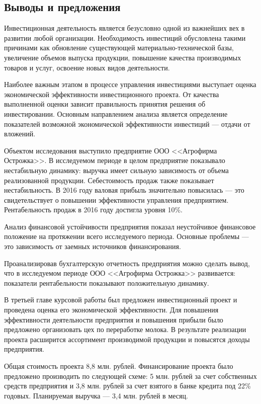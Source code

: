 \subsection*{Выводы и предложения}

Инвестиционная деятельность является безусловно одной из важнейших вех в развитии любой организации. Необходимость инвестиций обусловлена такими причинами как обновление существующей материально-технической базы, увеличение объемов выпуска продукции, повышение качества производимых товаров и услуг, освоение новых видов деятельности.

Наиболее важным этапом в процессе управления инвестициями выступает оценка экономической эффективности инвестиционного проекта. От качества выполненной оценки зависит правильность принятия решения об инвестировании. Основным направлением анализа является определение показателей возможной экономической эффективности инвестиций --- отдачи от вложений.

Объектом исследования выступило предприятие ООО <<Агрофирма Острожка>>. В исследуемом периоде в целом предприятие показывало нестабильную динамику: выручка имеет сильную зависимость от объема реализованной продукции. Себестоимость продаж также показывает нестабильность. В 2016 году валовая прибыль значительно повысилась --- это свидетельствует о повышении эффективности управления предприятием. Рентабельность продаж в 2016 году достигла уровня 10\%.

Анализ финансовой устойчивости предприятия показал неустойчивое финансовое положение на протяжении всего исследуемого периода. Основные проблемы --- это зависимость от заемных источников финансирования.

Проанализировав бухгалтерскую отчетность предприятия можно сделать вывод, что в исследуемом периоде ООО <<Агрофирма Острожка>> развивается: показатели рентабельности показывают положительную динамику.

В третьей главе курсовой работы был предложен инвестиционный проект и проведена оценка его экономической эффективности. Для повышения эффективности деятельности предприятия и повышения прибыли было предложено организовать цех по переработке молока. В результате реализации проекта расширится ассортимент производимой продукции и повысятся доходы предприятия.

Общая стоимость проекта 8,8 млн. рублей. Финансирование проекта было предложено производить по следующей схеме: 5 млн. рублей за счет собственных средств предприятия и 3,8 млн. рублей за счет взятого в банке кредита под 22\% годовых. Планируемая выручка --- 3,4 млн. рублей в месяц.

